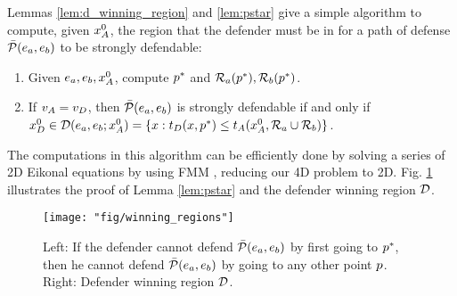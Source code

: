 Lemmas \ref{lem:d_winning_region} and \ref{lem:pstar} give a simple algorithm to compute, given $x_A^0$, the region that the defender must be in for a path of defense $\bar{\mathcal{P}}(e_a,e_b)$ to be strongly defendable:
\begin{enumerate}
\item Given $e_a, e_b,x_A^0$, compute $p^*$ and $\mathcal{R}_a(p^*),\mathcal{R}_b(p^*)$.
\item If $v_A=v_D$, then $\bar{\mathcal{P}}(e_a,e_b)$ is strongly defendable if and only if $x_D^0\in\mathcal{D}(e_a,e_b;x_A^0)=\{x:t_D(x,p^*) \le t_A(x_A^0,\mathcal{R}_a \cup \mathcal{R}_b)\}$. %
\end{enumerate}

The computations in this algorithm can be efficiently done by solving a series of 2D Eikonal equations by using FMM \cite{Sethian1996}, reducing our 4D problem to 2D. Fig. \ref{fig:lemma2} illustrates the proof of Lemma \ref{lem:pstar} and the defender winning region $\mathcal{D}$.

\begin{figure}
\centering
\texttt{[image: "fig/winning\_regions"]}
\caption{Left: If the defender cannot defend $\bar{\mathcal{P}}(e_a,e_b)$ by first going to $p^*$, then he cannot defend $\bar{\mathcal{P}}(e_a,e_b)$ by going to any other point $p$. Right: Defender winning region $\mathcal{D}$.}
\label{fig:lemma2}
\end{figure}
%


